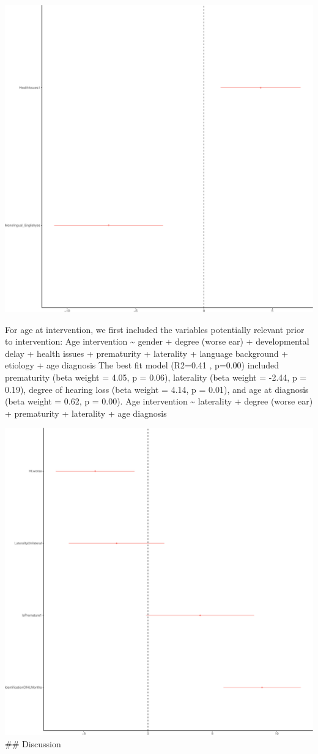 \documentclass[english,man,floatsintext]{apa6}
\begin{document}
\includegraphics{ELSSP_paper_files/figure-latex/diagnosis_betas-1.pdf}

For age at intervention, we first included the variables potentially relevant prior to intervention:
Age intervention \textasciitilde{} gender + degree (worse ear) + developmental delay + health issues + prematurity + laterality + language background + etiology + age diagnosis
The best fit model (R2=0.41 , p=0.00) included prematurity (beta weight = 4.05, p = 0.06), laterality (beta weight = -2.44, p = 0.19), degree of hearing loss (beta weight = 4.14, p = 0.01), and age at diagnosis (beta weight = 0.62, p = 0.00).
Age intervention \textasciitilde{} laterality + degree (worse ear) + prematurity + laterality + age diagnosis

\includegraphics{ELSSP_paper_files/figure-latex/intervention_betas-1.pdf}
\#\# Discussion
\end{document}
